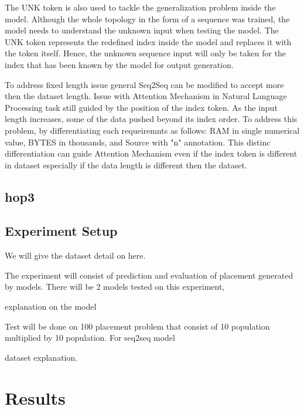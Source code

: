\documentclass[conference]{IEEEtran}
\begin{document}
The UNK token is also used to tackle the generalization problem inside the model. Although the whole topology in the form of a sequence was trained, the model needs to understand the unknown input when testing the model. The UNK token represents the redefined index inside the model and replaces it with the token itself. Hence, the unknown sequence input will only be taken for the index that has been known by the model for output generation.

To address fixed length issue general Seq2Seq can be modified to accept more then the dataset length. Issue with Attention Mechanism in Natural Language Processing task still guided by the position of the index token. As the input length increases, some of the data pushed beyond its index order. To address this problem, by differentiating each requeiremnts as follows: RAM in single numerical value, BYTES in thousands, and Source with "n" annotation. This distinc differentiation can guide Attention Mechanism even if the index token is different in dataset especially if the data length is different then the dataset.



\subsection{hop3}

\subsection{Experiment Setup}

We will give the dataset detail on here. 

The experiment will consist of prediction and evaluation of placement generated by models. There will be 2 models tested on this experiment, 

explanation on the model

Test will be done on 100 placement problem that consist of 10 population multiplied by 10 population. For seq2seq model 

dataset explanation. 







\section{Results}
\end{document}
